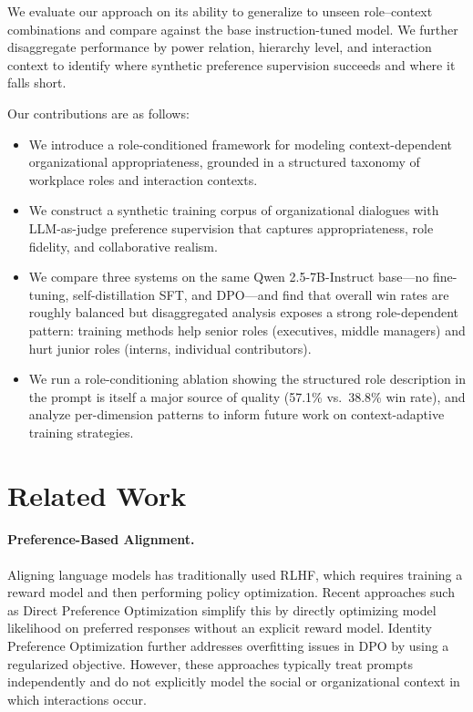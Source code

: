 \documentclass{article}
\begin{document}
We evaluate our approach on its ability to generalize to unseen role--context combinations and compare against the base instruction-tuned model. We further disaggregate performance by power relation, hierarchy level, and interaction context to identify where synthetic preference supervision succeeds and where it falls short.

Our contributions are as follows:
\begin{itemize}
    \item We introduce a role-conditioned framework for modeling context-dependent organizational appropriateness, grounded in a structured taxonomy of workplace roles and interaction contexts.
    \item We construct a synthetic training corpus of organizational dialogues with LLM-as-judge preference supervision that captures appropriateness, role fidelity, and collaborative realism.
    \item We compare three systems on the same Qwen 2.5-7B-Instruct base---no fine-tuning, self-distillation SFT, and DPO---and find that overall win rates are roughly balanced but disaggregated analysis exposes a strong role-dependent pattern: training methods help senior roles (executives, middle managers) and hurt junior roles (interns, individual contributors).
    \item We run a role-conditioning ablation showing the structured role description in the prompt is itself a major source of quality (57.1\% vs.\ 38.8\% win rate), and analyze per-dimension patterns to inform future work on context-adaptive training strategies.
\end{itemize}


\section{Related Work}

\paragraph{Preference-Based Alignment.}
Aligning language models has traditionally used RLHF, which requires training a reward model and then performing policy optimization. Recent approaches such as Direct Preference Optimization \citep{rafailov2023direct} simplify this by directly optimizing model likelihood on preferred responses without an explicit reward model. Identity Preference Optimization \citep{azar2023general} further addresses overfitting issues in DPO by using a regularized objective. However, these approaches typically treat prompts independently and do not explicitly model the social or organizational context in which interactions occur.
\end{document}
